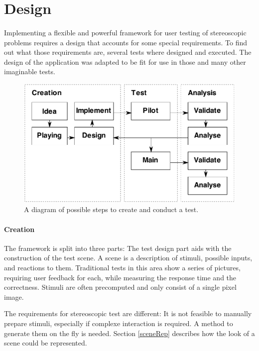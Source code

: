 \section{Design\label{Design}}
\paragraph{}
Implementing a flexible and powerful framework for user testing of stereoscopic problems requires a design that accounts for some special requirements. To find out what those requirements are, several tests where designed and executed. The design of the application was adapted to be fit for use in those and many other imaginable tests.

\begin{figure}[htb]
\begin{center}
\includegraphics[width=15cm]{media/workflow.pdf}
\caption{A diagram of possible steps to create and conduct a test.\label{imgWorkflow}}
\end{center}
\end{figure}

\paragraph{Creation}
The framework is split into three parts: The test design part aids with the construction of the test scene. A scene is a description of stimuli, possible inputs, and reactions to them. Traditional tests in this area show a series of pictures, requiring user feedback for each, while measuring the response time and the correctness. Stimuli are often precomputed and only consist of a single pixel image.

The requirements for stereoscopic test are different: It is not feasible to manually prepare stimuli, especially if complexe interaction is required. A method to generate them on the fly is needed.
Section \ref{sceneRep} describes how the look of a scene could be represented.

